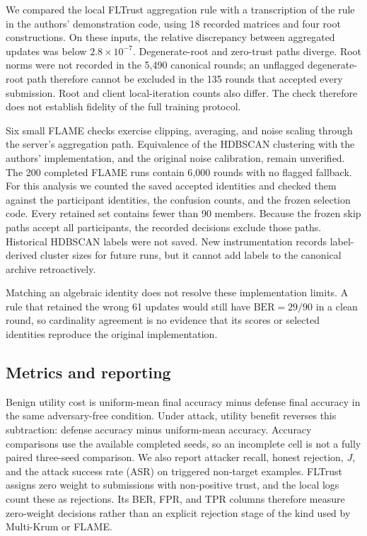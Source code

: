 \documentclass[journal]{IEEEtran}
\newcommand{\BER}{\mathrm{BER}}
\begin{document}
We compared the local FLTrust aggregation rule with a transcription of the rule in the authors' demonstration code, using 18 recorded matrices and four root constructions. On these inputs, the relative discrepancy between aggregated updates was below $2.8\times10^{-7}$. Degenerate-root and zero-trust paths diverge. Root norms were not recorded in the 5{,}490 canonical rounds; an unflagged degenerate-root path therefore cannot be excluded in the 135 rounds that accepted every submission. Root and client local-iteration counts also differ. The check therefore does not establish fidelity of the full training protocol.

Six small FLAME checks exercise clipping, averaging, and noise scaling through the server's aggregation path. Equivalence of the HDBSCAN clustering with the authors' implementation, and the original noise calibration, remain unverified. The 200 completed FLAME runs contain 6{,}000 rounds with no flagged fallback. For this analysis we counted the saved accepted identities and checked them against the participant identities, the confusion counts, and the frozen selection code. Every retained set contains fewer than 90 members. Because the frozen skip paths accept all participants, the recorded decisions exclude those paths. Historical HDBSCAN labels were not saved. New instrumentation records label-derived cluster sizes for future runs, but it cannot add labels to the canonical archive retroactively.

Matching an algebraic identity does not resolve these implementation limits. A rule that retained the wrong 61 updates would still have $\BER=29/90$ in a clean round, so cardinality agreement is no evidence that its scores or selected identities reproduce the original implementation.

\subsection{Metrics and reporting}
Benign utility cost is uniform-mean final accuracy minus defense final accuracy in the same adversary-free condition. Under attack, utility benefit reverses this subtraction: defense accuracy minus uniform-mean accuracy. Accuracy comparisons use the available completed seeds, so an incomplete cell is not a fully paired three-seed comparison. We also report attacker recall, honest rejection, $J$, and the attack success rate (ASR) on triggered non-target examples. FLTrust assigns zero weight to submissions with non-positive trust, and the local logs count these as rejections. Its BER, FPR, and TPR columns therefore measure zero-weight decisions rather than an explicit rejection stage of the kind used by Multi-Krum or FLAME.
\end{document}
